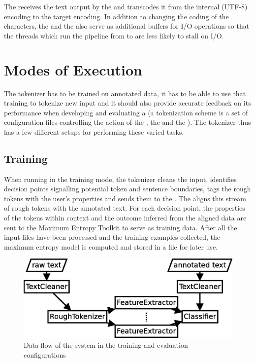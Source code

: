 The  receives the text output by the  and
transcodes it from the internal (UTF-8) encoding to the target encoding. In
addition to changing the coding of the characters, the  and the
 also serve as additional buffers for I/O operations so that
the threads which run the pipeline from  to
 are less likely to stall on I/O.


\section{Modes of Execution}
\label{sec:impl-modes}

The tokenizer has to be trained on annotated data, it has to be able to use
that training to tokenize new input and it should also provide accurate
feedback on its performance when developing and evaluating a
 (a tokenization scheme is a set of configuration
files controlling the action of the , the
 and the ). The tokenizer thus has a
few different setups for performing these varied tasks.

\subsection{Training}
\label{ssec:impl-modes-train}

When running in the training mode, the tokenizer cleans the input, identifies
decision points signalling potential token and sentence boundaries, tags the
rough tokens with the user's properties and sends them to the
. The  aligns this stream of rough tokens
with the annotated text. For each decision point, the properties of the tokens
within context and the outcome inferred from the aligned data are sent to the
Maximum Entropy Toolkit to serve as training data. After all the input files
have been processed and the training examples collected, the maximum entropy
model is computed and stored in a file for later use.

\begin{figure}
  \begin{center}
    \includegraphics[width=\textwidth]{img/train-parts.eps}
    \caption{Data flow of the system in the training and evaluation
             configurations}
    \label{fig:train-parts}
  \end{center}
\end{figure}

